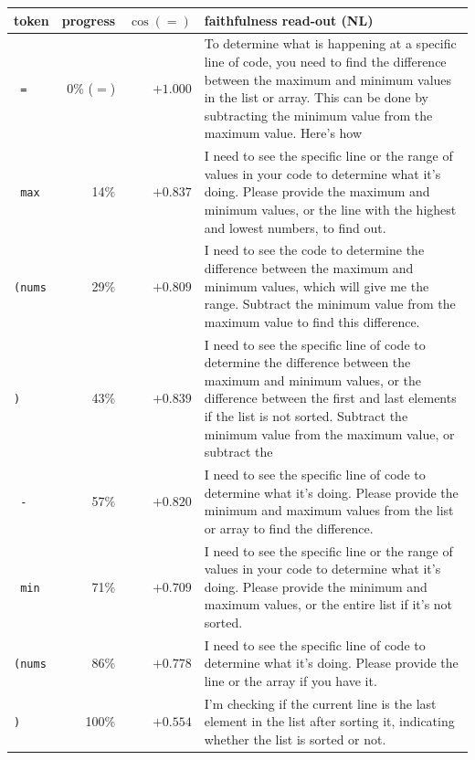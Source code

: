 \begin{tabular}{l r r p{7cm}}
\toprule
token & progress & $\cos(=)$ & faithfulness read-out (NL) \\
\midrule
\texttt{ =} & 0\% ($=$) & $+1.000$ & To determine what is happening at a specific line of code, you need to find the difference between the maximum and minimum values in the list or array. This can be done by subtracting the minimum value from the maximum value. Here's how \\
\texttt{ max} & 14\% & $+0.837$ & I need to see the specific line or the range of values in your code to determine what it's doing. Please provide the maximum and minimum values, or the line with the highest and lowest numbers, to find out. \\
\texttt{(nums} & 29\% & $+0.809$ & I need to see the code to determine the difference between the maximum and minimum values, which will give me the range. Subtract the minimum value from the maximum value to find this difference. \\
\texttt{)} & 43\% & $+0.839$ & I need to see the specific line of code to determine the difference between the maximum and minimum values, or the difference between the first and last elements if the list is not sorted. Subtract the minimum value from the maximum value, or subtract the \\
\texttt{ -} & 57\% & $+0.820$ & I need to see the specific line of code to determine what it's doing. Please provide the minimum and maximum values from the list or array to find the difference. \\
\texttt{ min} & 71\% & $+0.709$ & I need to see the specific line or the range of values in your code to determine what it's doing. Please provide the minimum and maximum values, or the entire list if it's not sorted. \\
\texttt{(nums} & 86\% & $+0.778$ & I need to see the specific line of code to determine what it's doing. Please provide the line or the array if you have it. \\
\texttt{)
} & 100\% & $+0.554$ & I'm checking if the current line is the last element in the list after sorting it, indicating whether the list is sorted or not. \\
\bottomrule
\end{tabular}
